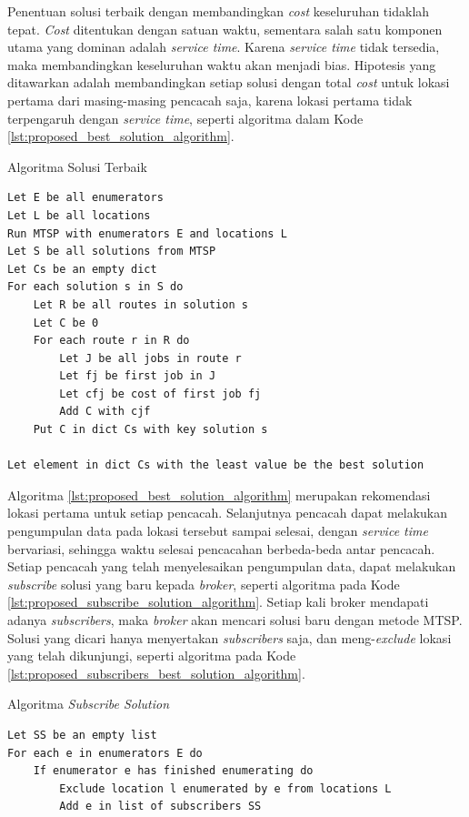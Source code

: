 Penentuan solusi terbaik dengan membandingkan \textit{cost} keseluruhan tidaklah tepat. \textit{Cost} ditentukan dengan satuan waktu, sementara salah satu komponen utama yang dominan adalah \textit{service time}. Karena \textit{service time} tidak tersedia, maka membandingkan keseluruhan waktu akan menjadi bias. Hipotesis yang ditawarkan adalah membandingkan setiap solusi dengan total \textit{cost} untuk lokasi pertama dari masing-masing pencacah saja, karena lokasi pertama tidak terpengaruh dengan \textit{service time}, seperti algoritma dalam Kode \ref{lst:proposed_best_solution_algorithm}.


\begin{listing}
	\caption{Algoritma Solusi Terbaik}
	\label{lst:proposed_best_solution_algorithm}
	\begin{verbatim}
Let E be all enumerators
Let L be all locations
Run MTSP with enumerators E and locations L
Let S be all solutions from MTSP
Let Cs be an empty dict
For each solution s in S do
	Let R be all routes in solution s
	Let C be 0
	For each route r in R do
		Let J be all jobs in route r
		Let fj be first job in J
		Let cfj be cost of first job fj
		Add C with cjf
	Put C in dict Cs with key solution s
	
Let element in dict Cs with the least value be the best solution
	\end{verbatim}
\end{listing}


Algoritma \ref{lst:proposed_best_solution_algorithm} merupakan rekomendasi lokasi pertama untuk setiap pencacah. Selanjutnya pencacah dapat melakukan pengumpulan data pada lokasi tersebut sampai selesai, dengan \textit{service time} bervariasi, sehingga waktu selesai pencacahan berbeda-beda antar pencacah. Setiap pencacah yang telah menyelesaikan pengumpulan data, dapat melakukan \textit{subscribe} solusi yang baru kepada \textit{broker}, seperti algoritma pada Kode \ref{lst:proposed_subscribe_solution_algorithm}. Setiap kali broker mendapati adanya \textit{subscribers}, maka \textit{broker} akan mencari solusi baru dengan metode MTSP. Solusi yang dicari hanya menyertakan \textit{subscribers} saja, dan meng-\textit{exclude} lokasi yang telah dikunjungi, seperti algoritma pada Kode \ref{lst:proposed_subscribers_best_solution_algorithm}.


\begin{listing}
	\caption{Algoritma \textit{Subscribe Solution}}
	\label{lst:proposed_subscribe_solution_algorithm}
	\begin{verbatim}
Let SS be an empty list
For each e in enumerators E do
	If enumerator e has finished enumerating do
		Exclude location l enumerated by e from locations L
		Add e in list of subscribers SS
	\end{verbatim}
\end{listing}


